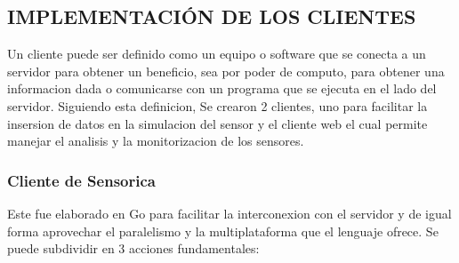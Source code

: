 
\subsection{IMPLEMENTACIÓN DE LOS CLIENTES}

Un cliente puede ser definido como un equipo o software que se conecta a un
servidor para obtener un beneficio, sea por poder de computo, para obtener
una informacion dada o comunicarse con un programa que se ejecuta en el lado
del servidor. Siguiendo esta definicion, Se crearon 2 clientes, uno para
facilitar la insersion de datos en la simulacion del sensor y el cliente web
el cual permite manejar el analisis y la monitorizacion de los sensores.

\subsubsection{Cliente de Sensorica}

Este fue elaborado en Go para facilitar la interconexion con el servidor y
de igual forma aprovechar el paralelismo y la multiplataforma que el
lenguaje ofrece. Se puede subdividir en 3 acciones fundamentales:

